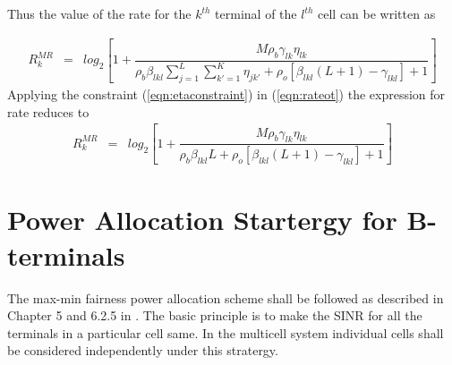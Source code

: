 \documentclass[10pt, a4paper, twoside,fleqn]{article}
\begin{document}
Thus the value of the rate for the $k^{th}$ terminal of the $l^{th}$ cell can be written as

\begin{eqnarray}\label{eqn:rateot}
	R_k^{MR} &=& log_2\left[1+ \dfrac{M\rho_b\gamma_{lk}\eta_{lk}}{\rho_b\beta_{lkl}\sum\limits_{j=1}^{L} \sum\limits_{k' = 1}^{K}\eta_{jk'}
				+\rho_o[\beta_{lkl}(L+1)-\gamma_{lkl}]
				+1}\right]
\end{eqnarray}
Applying the constraint (\ref{eqn:etaconstraint}) in (\ref{eqn:rateot}) the expression for rate reduces to
\begin{eqnarray}\label{eqn:finalratebt}
R_k^{MR} &=& log_2\left[1+ \dfrac{M\rho_b\gamma_{lk}\eta_{lk}}{\rho_b\beta_{lkl}L
    +\rho_o[\beta_{lkl}(L+1)-\gamma_{lkl}]
    +1}\right]
\end{eqnarray}


\section{Power Allocation Startergy for B-terminals}
  The max-min fairness power allocation scheme shall be followed as described in Chapter 5 and 6.2.5 in \cite{bib:MassiveMimoBook}. The basic principle is to make the SINR for all the terminals in a particular cell same. In the multicell system individual cells shall be considered independently under this stratergy. 
\end{document}

